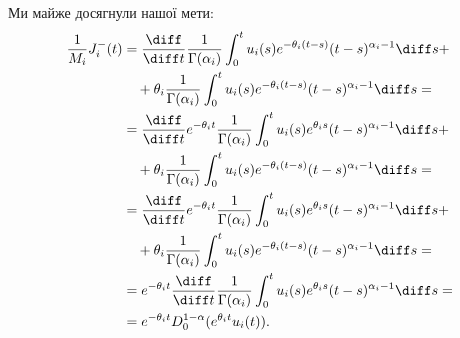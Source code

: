 Ми майже досягнули нашої мети:
\begin{equation}
    \begin{aligned}
        \frac{1}{M_i} J_i^-(t)
        &= \frac{\diff}{\diff t} \frac{1}{\Gamma(\alpha_i)} \int_0^t u_i(s) e^{-\theta_i (t - s)} (t - s)^{\alpha_i - 1} \diff s + \\
        &\quad + \theta_i \frac{1}{\Gamma(\alpha_i)} \int_0^t u_i(s) e^{-\theta_i (t - s)} (t - s)^{\alpha_i - 1} \diff s = \\
        &= \frac{\diff}{\diff t} e^{-\theta_i t} \frac{1}{\Gamma(\alpha_i)} \int_0^t u_i(s) e^{\theta_i s} (t - s)^{\alpha_i - 1} \diff s + \\
        &\quad + \theta_i \frac{1}{\Gamma(\alpha_i)} \int_0^t u_i(s) e^{-\theta_i (t - s)} (t - s)^{\alpha_i - 1} \diff s = \\
        &= \frac{\diff}{\diff t} e^{-\theta_i t} \frac{1}{\Gamma(\alpha_i)} \int_0^t u_i(s) e^{\theta_i s} (t - s)^{\alpha_i - 1} \diff s + \\
        &\quad + \theta_i \frac{1}{\Gamma(\alpha_i)} \int_0^t u_i(s) e^{-\theta_i (t - s)} (t - s)^{\alpha_i - 1} \diff s = \\
        &= e^{-\theta_i t} \frac{\diff}{\diff t} \frac{1}{\Gamma(\alpha_i)} \int_0^t u_i(s) e^{\theta_i s} (t - s)^{\alpha_i - 1} \diff s = \\
        &= e^{-\theta_i t} D_0^{1 - \alpha} (e^{\theta_i t} u_i(t)).
    \end{aligned}
\end{equation}

